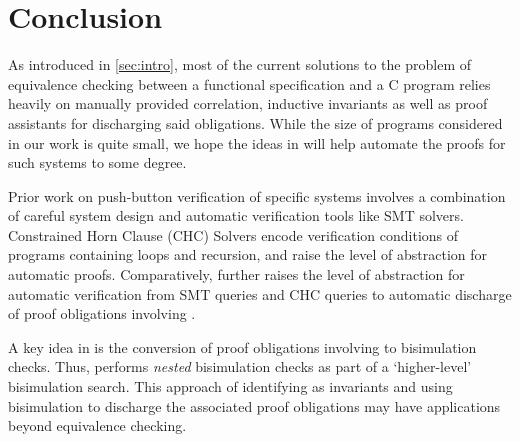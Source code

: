 \section{Conclusion}
\label{sec:conclusion}
As introduced in \cref{sec:intro}, most of the current solutions
to the problem of equivalence checking between a functional specification
and a C program relies heavily on manually provided correlation, inductive
invariants as well as proof assistants for discharging said obligations.
While the size of programs considered in our work is quite small,
we hope the ideas in \toolName{} will help
automate the proofs for such systems to some degree.

Prior work on push-button verification of specific
systems \cite{fscq,hyperkernel,serval,verifiedBPF}
involves a combination of careful system design and
automatic verification tools like SMT solvers.
Constrained Horn Clause (CHC) Solvers \cite{CHCeq}
encode verification conditions of programs containing loops and recursion,
and raise the level of abstraction for automatic proofs.
Comparatively, \toolName{} further raises the level
of abstraction for automatic verification from
SMT queries and CHC queries to automatic discharge of
proof obligations involving \recursiveRelations{}.

A key idea in \toolName{} is the conversion of proof
obligations involving \recursiveRelations{} to
bisimulation checks. Thus, \toolName{} performs {\em nested}
bisimulation checks as part of a `higher-level'
bisimulation search. This approach of
identifying \recursiveRelations{} as invariants and using
bisimulation to discharge the associated
proof obligations may have applications
beyond equivalence checking.
